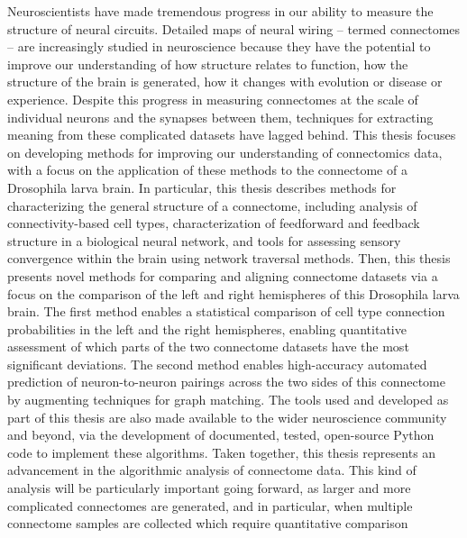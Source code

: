Neuroscientists have made tremendous progress in our ability to measure the structure
of neural circuits. Detailed maps of neural wiring – termed connectomes – are
increasingly studied in neuroscience because they have the potential to improve our
understanding of how structure relates to function, how the structure of the brain
is generated, how it changes with evolution or disease or experience. Despite this
progress in measuring connectomes at the scale of individual neurons and the synapses
between them, techniques for extracting meaning from these complicated datasets
have lagged behind.
This thesis focuses on developing methods for improving our understanding of
connectomics data, with a focus on the application of these methods to the connectome
of a Drosophila larva brain. In particular, this thesis describes methods for characterizing the general structure of a connectome, including analysis of connectivity-based
cell types, characterization of feedforward and feedback structure in a biological
neural network, and tools for assessing sensory convergence within the brain using
network traversal methods. Then, this thesis presents novel methods for comparing
and aligning connectome datasets via a focus on the comparison of the left and right
hemispheres of this Drosophila larva brain. The first method enables a statistical
comparison of cell type connection probabilities in the left and the right hemispheres,
enabling quantitative assessment of which parts of the two connectome datasets have
the most significant deviations. The second method enables high-accuracy automated
prediction of neuron-to-neuron pairings across the two sides of this connectome by
augmenting techniques for graph matching. The tools used and developed as part of
this thesis are also made available to the wider neuroscience community and beyond,
via the development of documented, tested, open-source Python code to implement
these algorithms.
Taken together, this thesis represents an advancement in the algorithmic analysis
of connectome data. This kind of analysis will be particularly important going forward,
as larger and more complicated connectomes are generated, and in particular, when
multiple connectome samples are collected which require quantitative comparison



